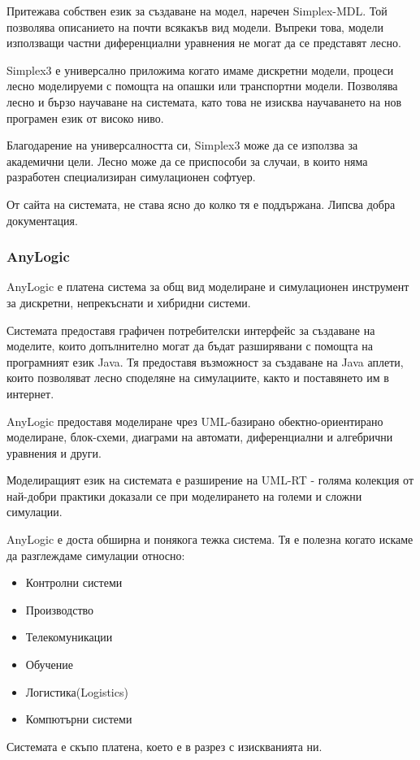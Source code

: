 			Притежава собствен език за създаване на модел, наречен Simplex-MDL. 
			Той позволява описанието на почти всякакъв вид модели. Въпреки това,
			модели използващи частни диференциални уравнения не могат да се представят
			лесно.
			
			Simplex3 е универсално приложима когато имаме дискретни модели, процеси
			лесно моделируеми с помощта на опашки или транспортни модели. 
			Позволява лесно и бързо научаване на системата, като това не изисква
			научаването на нов програмен език от високо ниво.
			
			Благодарение на универсалността си, Simplex3 може да се използва за академични цели.
			Лесно може да се приспособи за случаи, в които няма разработен специализиран симулационен
			софтуер. 
			
			От сайта на системата, не става ясно до колко тя е поддържана. 
			Липсва добра документация.\cite{Simplex3}
		
		\subsubsection{AnyLogic}
			AnyLogic е платена система за общ вид моделиране и симулационен инструмент за 
			дискретни, непрекъснати и хибридни системи.
			
			Системата предоставя графичен потребителски интерфейс за създаване на моделите, 
			които допълнително могат да бъдат разширявани с помощта на програмният език Java. 
			Тя предоставя възможност за създаване на Java аплети, 
			които позволяват лесно споделяне на симулациите, както и поставянето им в интернет.
			
			AnyLogic предоставя моделиране чрез UML-базирано обектно-ориентирано моделиране, блок-схеми, 
			диаграми на автомати, диференциални и алгебрични уравнения и други.
		
			Моделиращият език на системата е разширение на UML-RT - голяма колекция от най-добри практики
			доказали се при моделирането на големи и сложни симулации.
			
			AnyLogic е доста обширна и понякога тежка система. 
			Тя е полезна когато искаме да разглеждаме симулации относно:
			
			\begin{itemize}
			\item Контролни системи
			\item Производство
			\item Телекомуникации
			\item Обучение
			\item Логистика(Logistics)
			\item Компютърни системи
			\end{itemize}
			
			Системата е скъпо платена, което е в разрез с изискванията ни. \cite{AnyLogic}